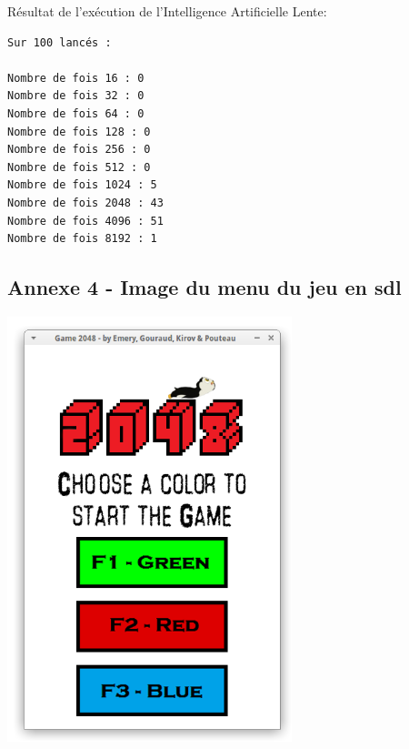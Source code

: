 \documentclass[a4paper]{article}
\begin{document}
\noindent
Résultat de l'exécution de l'Intelligence Artificielle Lente:
\begin{verbatim}
Sur 100 lancés : 

Nombre de fois 16 : 0
Nombre de fois 32 : 0
Nombre de fois 64 : 0
Nombre de fois 128 : 0
Nombre de fois 256 : 0
Nombre de fois 512 : 0
Nombre de fois 1024 : 5
Nombre de fois 2048 : 43
Nombre de fois 4096 : 51
Nombre de fois 8192 : 1
\end{verbatim}

\newpage
\subsection{Annexe 4 - Image du menu du jeu en sdl}
\label{sec-7-4}
\noindent
\includegraphics{Screenshot-jeu-sdl.png}
\end{document}
